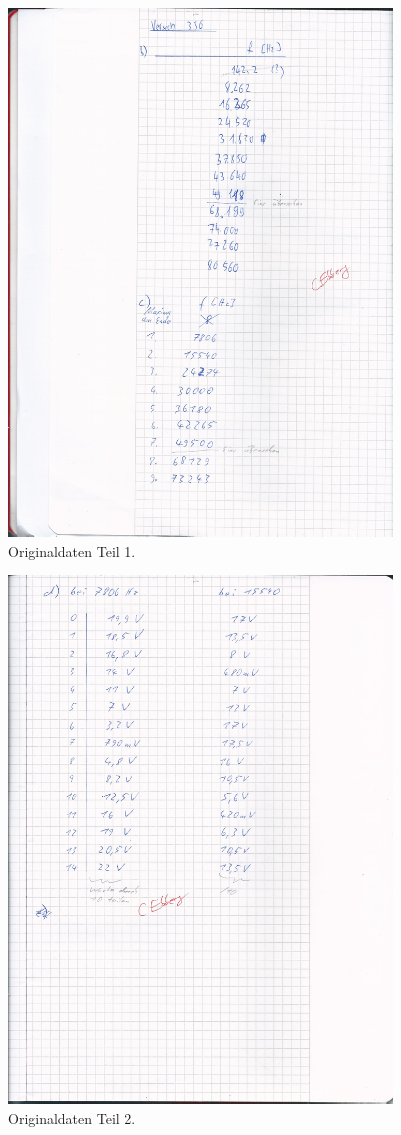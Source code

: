 \begin{figure}[H]
  \centering
  \includegraphics[height=14cm]{original-1.jpg}
  \caption{Originaldaten Teil 1.}
  \label{fig:original1}
\end{figure}
\begin{figure}[H]
  \centering
  \includegraphics[height=14cm]{original-2.jpg}
  \caption{Originaldaten Teil 2.}
  \label{fig:original2}
\end{figure}

